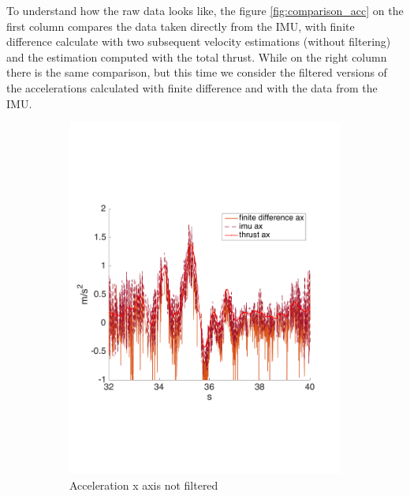 To understand how the raw data looks like, the figure \ref{fig:comparison_acc} on the first column compares the data taken directly from the IMU, with finite difference calculate with two subsequent velocity estimations (without filtering) and the estimation computed with the total thrust. While on the right column there is the same comparison, but this time we consider the filtered versions of the accelerations calculated with finite difference and with the data from the IMU.
\begin{figure}[!htbp]
 \centering   
     \begin{subfigure}[b]{0.45\textwidth}
     \includegraphics[width=\textwidth]{img/acceleration_mass_changed_no_filter_x.pdf}
        \caption{Acceleration x axis not filtered}
        \label{fig:comparison_accx}
   \end{subfigure}
    \begin{subfigure}[b]{0.45\textwidth}

\end{subfigure}
\end{figure}
